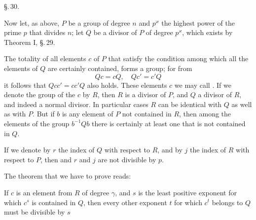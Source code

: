 \begin{center}
\S.\,30.\\
\end{center}

Now let, as above, $P$ be a group of degree $n$ and $p^{\varkappa}$ the highest power of the prime $p$ that divides $n$; let $Q$ be a divisor of $P$ of degree $p^{\varkappa}$, which exists by Theorem I, \S.\,29.

The totality of all elements $c$ of $P$ that satisfy the condition
among which all the elements of $Q$ are certainly contained, forms a group; for from
\[ Qc = cQ,\quad Qc' = c'Q \]
it follows that $Qcc' = cc'Q$ also holds. These elements $c$ we may call . If we denote the group of the $c$ by $R$, then $R$ is a divisor of $P$, and $Q$ a divisor of $R$, and indeed a normal divisor. In particular cases $R$ can be identical with $Q$ as well as with $P$. But if $b$ is any element of $P$ not contained in $R$, then among the elements of the group $b^{-1}Qb$ there is certainly at least one that is not contained in $Q$.

If we denote by $r$ the index of $Q$ with respect to $R$, and by $j$ the index of $R$ with respect to $P$, then
and $r$ and $j$ are not divisible by $p$.

The theorem that we have to prove reads:


If $c$ is an element from $R$ of degree $\gamma$, and $s$ is the least positive exponent for which $c^s$ is contained in $Q$, then every other exponent $t$ for which $c^t$ belongs to $Q$ must be divisible by $s$
